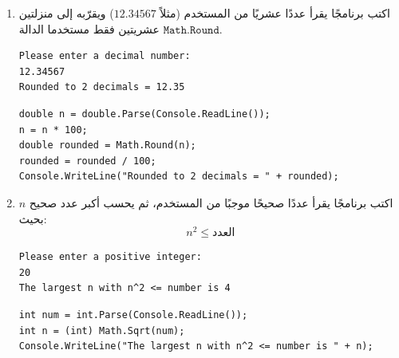 \documentclass[14pt]{extarticle}
\begin{document}
\begin{enumerate}[itemsep=3em]
    \item
    اكتب برنامجًا يقرأ عددًا عشريًا من المستخدم (مثلاً $12.34567$) ويقرّبه إلى منزلتين عشريتين فقط مستخدما الدالة $\mathtt{Math.Round}$. \\
    \ifdetailed
    \begin{boxExample}
    \begin{english}
    \begin{verbatim}
Please enter a decimal number:
12.34567
Rounded to 2 decimals = 12.35
    \end{verbatim}
    \end{english}
    \end{boxExample}
    \ifwithsols
    \begin{boxSolution}
    \begin{english}
    \begin{verbatim}
double n = double.Parse(Console.ReadLine());
n = n * 100;
double rounded = Math.Round(n);
rounded = rounded / 100;
Console.WriteLine("Rounded to 2 decimals = " + rounded);
    \end{verbatim}
    \end{english}
    \end{boxSolution}
    \fi
    \fi

    \item
    اكتب برنامجًا يقرأ عددًا صحيحًا موجبًا من المستخدم، ثم يحسب أكبر عدد صحيح $n$ بحيث:
    $$ n^2 \leq \text{العدد} $$
    \ifdetailed
    \begin{boxExample}
    \begin{english}
    \begin{verbatim}
Please enter a positive integer:
20
The largest n with n^2 <= number is 4
    \end{verbatim}
    \end{english}
    \end{boxExample}
    \ifwithsols
    \begin{boxSolution}
    \begin{english}
    \begin{verbatim}
int num = int.Parse(Console.ReadLine());
int n = (int) Math.Sqrt(num);
Console.WriteLine("The largest n with n^2 <= number is " + n);
    \end{verbatim}
    \end{english}
    \end{boxSolution}
    \fi
\fi
\end{enumerate}
\end{document}
